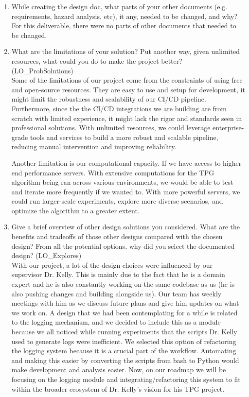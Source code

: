 \documentclass[12pt, titlepage]{article}
\begin{document}
\begin{enumerate}
  \item While creating the design doc, what parts of your other documents (e.g.
  requirements, hazard analysis, etc), it any, needed to be changed, and why?\\
  
  For this deliverable, there were no parts of other documents that needed to be changed.

  \item What are the limitations of your solution?  Put another way, given
  unlimited resources, what could you do to make the project better? (LO\_ProbSolutions)\\
  
  Some of the limitations of our project come from the constraints of using free and open-source resources. They are easy to use and setup for development, it might limit the robustness and scalability of our CI/CD pipeline. Furthermore, since the the CI/CD integrations we are building are from scratch with limited experience, it might lack the rigor and standards seen in professional solutions. With unlimited resources, we could leverage enterprise-grade tools and services to build a more robust and scalable pipeline, reducing manual intervention and improving reliability.


Another limitation is our computational capacity. If we have access to higher end performance servers. With extensive computations for the TPG algorithm being ran across various environments, we would be able to test and iterate more frequently if we wanted to. With more powerful servers, we could run larger-scale experiments, explore more diverse scenarios, and optimize the algorithm to a greater extent.

  \item Give a brief overview of other design solutions you considered.  What
  are the benefits and tradeoffs of those other designs compared with the chosen
  design?  From all the potential options, why did you select the documented design?
  (LO\_Explores)\\
  
  With our project, a lot of the design choices were influenced by our supervisor Dr. Kelly. This is mainly due to the fact that he is a domain expert and he is also constantly working on the same codebase as us (he is also pushing changes and building alongside us). Our team has weekly meetings with him as we discuss future plans and give him updates on what we work on. A design that we had been contemplating for a while is related to the logging mechanism, and we decided to include this as a module because we all noticed while running experiments that the scripts Dr. Kelly used to generate logs were inefficient. We selected this option of refactoring the logging system because it is a crucial part of the workflow. Automating and making this easier by converting the scripts from bash to Python would make development and analysis easier. Now, on our roadmap we will be focusing on the logging module and integrating/refactoring this system to fit within the broader ecosystem of Dr. Kelly’s vision for his TPG project. 
\end{enumerate}
\end{document}
